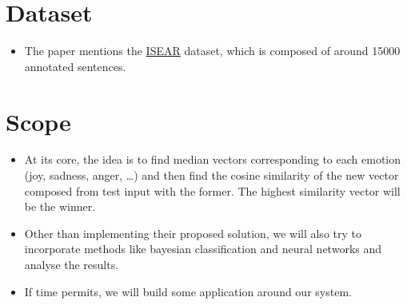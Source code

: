 \section{Dataset}
\label{sec-dataset}
\begin{itemize}
\item The paper mentions the \href{https://github.com/bogdanneacsa/tts-master/blob/master/ISEAR/DATA.csv}{ISEAR} dataset, which is composed of around 15000 annotated sentences.
\end{itemize}
\section{Scope}
\begin{itemize}
\item At its core, the idea is to find median vectors corresponding to each emotion (joy, sadness, anger, \ldots) and then find the cosine similarity of the new vector composed from test input with the former. The highest similarity vector will be the winner.
\item Other than implementing their proposed solution, we will also try to incorporate methods like bayesian classification and neural networks and analyse the results.
\item If time permits, we will build some application around our system.
\end{itemize}

